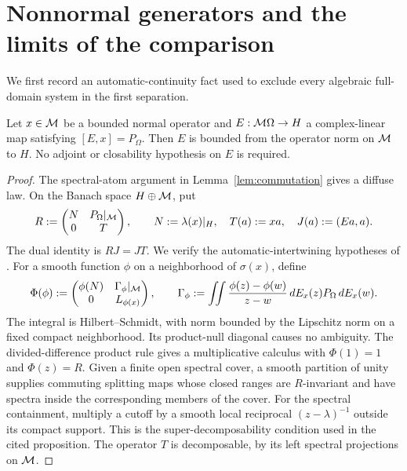 \section{Nonnormal generators and the limits of the comparison}\label{sec:examples}
We first record an automatic-continuity fact used to exclude every algebraic full-domain system in the first separation.

\begin{lemma}\label{lem:automatic}
Let $x\in\mathcal M$ be a bounded normal operator and $E:\mathcal M\Omega\to H$ a complex-linear map satisfying $[E,x]=P_\Omega$.
Then $E$ is bounded from the operator norm on $\mathcal M$ to $H$.
No adjoint or closability hypothesis on $E$ is required.
\end{lemma}
\begin{proof}
The spectral-atom argument in Lemma~\ref{lem:commutation} gives a diffuse law.
On the Banach space $H\oplus\mathcal M$, put
\[
 R:=\begin{pmatrix}N&P_\Omega|_\mathcal M\\0&T\end{pmatrix},\qquad
 N:=\lambda(x)|_H,\quad T(a):=xa,\quad J(a):=(Ea,a).
\]
The dual identity is $RJ=JT$.
We verify the automatic-intertwining hypotheses of \cite[Proposition~3.7 and Theorem~4.1]{Lau88}.
For a smooth function $\phi$ on a neighborhood of $\sigma(x)$, define
\[
 \Phi(\phi):=
 \begin{pmatrix}\phi(N)&\Gamma_\phi|_\mathcal M\\0&L_{\phi(x)}\end{pmatrix},\qquad
 \Gamma_\phi:=\iint\frac{\phi(z)-\phi(w)}{z-w}\,dE_x(z)P_\Omega\,dE_x(w).
\]
The integral is Hilbert--Schmidt, with norm bounded by the Lipschitz norm on a fixed compact neighborhood.
Its product-null diagonal causes no ambiguity.
The divided-difference product rule gives a multiplicative calculus with $\Phi(1)=1$ and $\Phi(z)=R$.
Given a finite open spectral cover, a smooth partition of unity supplies commuting splitting maps whose closed ranges are $R$-invariant and have spectra inside the corresponding members of the cover.
For the spectral containment, multiply a cutoff by a smooth local reciprocal $(z-\lambda)^{-1}$ outside its compact support.
This is the super-decomposability condition used in the cited proposition.
The operator $T$ is decomposable, by its left spectral projections on $\mathcal M$.


\end{proof}
